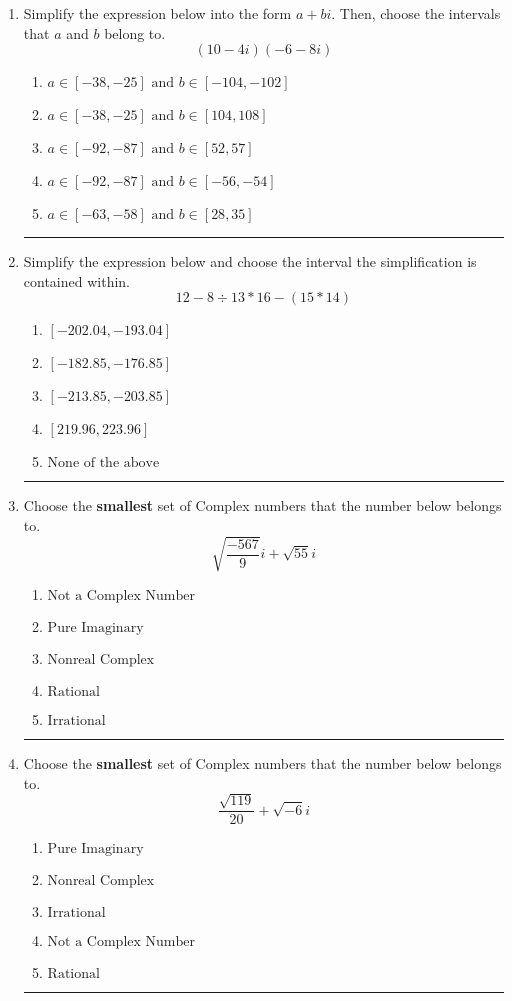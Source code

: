 \documentclass[14pt]{extbook}
\newcommand{\litem}[1]{\item#1\hspace*{-1cm}\rule{\textwidth}{0.4pt}}
\begin{document}
\begin{enumerate}
\litem{
Simplify the expression below into the form $a+bi$. Then, choose the intervals that $a$ and $b$ belong to.\[ (10 - 4 i)(-6 - 8 i) \]\begin{enumerate}[label=\Alph*.]
\item \( a \in [-38, -25] \text{ and } b \in [-104, -102] \)
\item \( a \in [-38, -25] \text{ and } b \in [104, 108] \)
\item \( a \in [-92, -87] \text{ and } b \in [52, 57] \)
\item \( a \in [-92, -87] \text{ and } b \in [-56, -54] \)
\item \( a \in [-63, -58] \text{ and } b \in [28, 35] \)

\end{enumerate} }
\litem{
Simplify the expression below and choose the interval the simplification is contained within.\[ 12 - 8 \div 13 * 16 - (15 * 14) \]\begin{enumerate}[label=\Alph*.]
\item \( [-202.04, -193.04] \)
\item \( [-182.85, -176.85] \)
\item \( [-213.85, -203.85] \)
\item \( [219.96, 223.96] \)
\item \( \text{None of the above} \)

\end{enumerate} }
\litem{
Choose the \textbf{smallest} set of Complex numbers that the number below belongs to.\[ \sqrt{\frac{-567}{9}} i+\sqrt{55}i \]\begin{enumerate}[label=\Alph*.]
\item \( \text{Not a Complex Number} \)
\item \( \text{Pure Imaginary} \)
\item \( \text{Nonreal Complex} \)
\item \( \text{Rational} \)
\item \( \text{Irrational} \)

\end{enumerate} }
\litem{
Choose the \textbf{smallest} set of Complex numbers that the number below belongs to.\[ \frac{\sqrt{119}}{20}+\sqrt{-6}i \]\begin{enumerate}[label=\Alph*.]
\item \( \text{Pure Imaginary} \)
\item \( \text{Nonreal Complex} \)
\item \( \text{Irrational} \)
\item \( \text{Not a Complex Number} \)
\item \( \text{Rational} \)


\end{enumerate}}
\end{enumerate}
\end{document}
